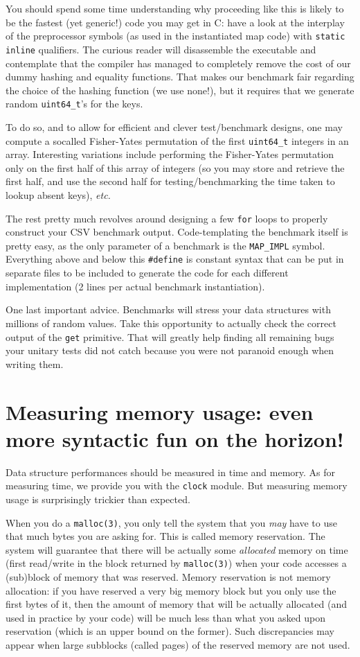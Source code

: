 You should spend some time understanding why proceeding like this is likely to be the fastest (yet generic!) code you may get in C: have a look at the interplay of the preprocessor symbols (as used in the instantiated map code) with \texttt{static inline} qualifiers. The curious reader will disassemble the executable and contemplate that the compiler has managed to completely remove the cost of our dummy hashing and equality functions. That makes our benchmark fair regarding the choice of the hashing function (we use none!), but it requires that we generate random \texttt{uint64\_t}'s for the keys.

To do so, and to allow for efficient and clever test/benchmark designs, one may compute a socalled Fisher-Yates permutation of the first \texttt{uint64\_t} integers in an array. Interesting variations include performing the Fisher-Yates permutation only on the first half of this array of integers (so you may store and retrieve the first half, and use the second half for testing/benchmarking the time taken to lookup absent keys), \textit{etc.}

The rest pretty much revolves around designing a few \texttt{for} loops to properly construct your CSV benchmark output. Code-templating the benchmark itself is pretty easy, as the only parameter of a benchmark is the \texttt{MAP\_IMPL} symbol. Everything above and below this \texttt{\#define} is constant syntax that can be put in separate files to be included to generate the code for each different implementation (2 lines per actual benchmark instantiation).

One last important advice. Benchmarks will stress your data structures with millions of random values. Take this opportunity to actually check the correct output of the \texttt{get} primitive. That will greatly help finding all remaining bugs your unitary tests did not catch because you were not paranoid enough when writing them.

\section*{Measuring memory usage: even more syntactic fun on the horizon!}

Data structure performances should be measured in time and memory. As for measuring time, we provide you with the \texttt{clock} module. But measuring memory usage is surprisingly trickier than expected. 

When you do a \texttt{malloc(3)}, you only tell the system that you \textit{may} have to use that much bytes you are asking for. This is called memory reservation. The system will guarantee that there will be actually some \textit{allocated} memory on time (first read/write in the block returned by \texttt{malloc(3)}) when your code accesses a (sub)block of memory that was reserved. Memory reservation is not memory allocation: if you have reserved a very big memory block but you only use the first bytes of it, then the amount of memory that will be actually allocated (and used in practice by your code) will be much less than what you asked upon reservation (which is an upper bound on the former). Such discrepancies may appear when large subblocks (called pages) of the reserved memory are not used. 

